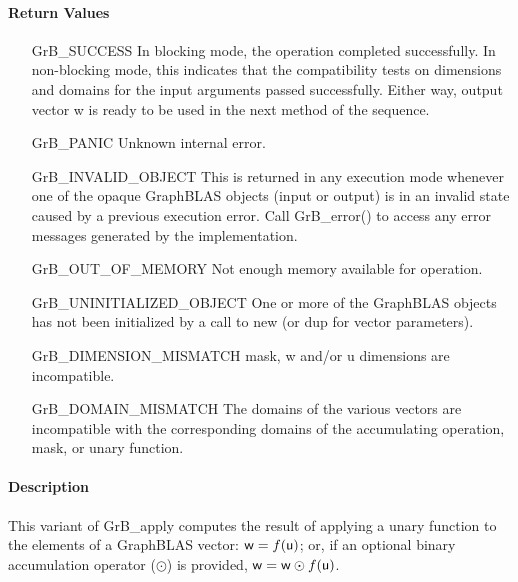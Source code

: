 \paragraph{Return Values}

\begin{itemize}[leftmargin=2.1in]
    \item[{\sf GrB\_SUCCESS}]         In blocking mode, the operation completed
    successfully. In non-blocking mode, this indicates that the compatibility 
    tests on dimensions and domains for the input arguments passed successfully. 
    Either way, output vector {\sf w} is ready to be used in the next method of 
    the sequence.

    \item[{\sf GrB\_PANIC}]           Unknown internal error.

    \item[{\sf GrB\_INVALID\_OBJECT}] This is returned in any execution mode 
    whenever one of the opaque GraphBLAS objects (input or output) is in an invalid 
    state caused by a previous execution error.  Call {\sf GrB\_error()} to access 
    any error messages generated by the implementation.

    \item[{\sf GrB\_OUT\_OF\_MEMORY}] Not enough memory available for operation.

    \item[{\sf GrB\_UNINITIALIZED\_OBJECT}] One or more of the GraphBLAS objects
    has not been initialized by a call to {\sf new} (or {\sf dup} for vector
    parameters).

    \item[{\sf GrB\_DIMENSION\_MISMATCH}]  {\sf mask}, {\sf w} and/or {\sf u}
    dimensions are incompatible.

    \item[{\sf GrB\_DOMAIN\_MISMATCH}]    The domains of the various vectors are
    incompatible with the corresponding domains of the accumulating operation, 
    mask, or unary function.
\end{itemize}

\paragraph{Description}

This variant of {\sf GrB\_apply} computes the result of applying a unary function
to the elements of a GraphBLAS vector:
${\sf w} = f({\sf u})$; or, if an optional binary accumulation 
operator ($\odot$) is provided, ${\sf w} = {\sf w} \odot f({\sf u})$.  

